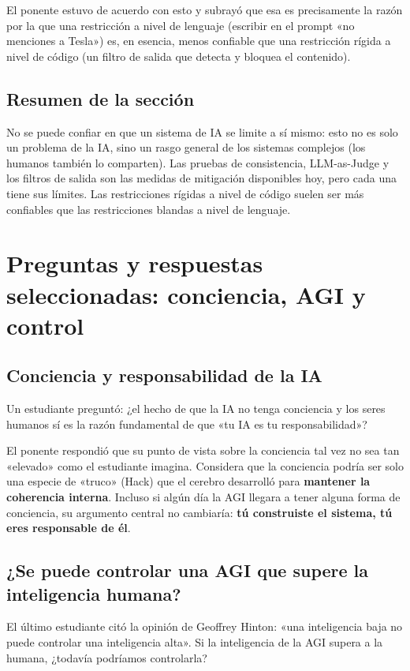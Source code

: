 \documentclass[a4paper]{article}
\begin{document}
El ponente estuvo de acuerdo con esto y subrayó que esa es precisamente la razón por la que una restricción a nivel de lenguaje (escribir en el prompt «no menciones a Tesla») es, en esencia, menos confiable que una restricción rígida a nivel de código (un filtro de salida que detecta y bloquea el contenido).

\subsection{Resumen de la sección}

No se puede confiar en que un sistema de IA se limite a sí mismo: esto no es solo un problema de la IA, sino un rasgo general de los sistemas complejos (los humanos también lo comparten). Las pruebas de consistencia, LLM-as-Judge y los filtros de salida son las medidas de mitigación disponibles hoy, pero cada una tiene sus límites. Las restricciones rígidas a nivel de código suelen ser más confiables que las restricciones blandas a nivel de lenguaje.

\section{Preguntas y respuestas seleccionadas: conciencia, AGI y control}

\subsection{Conciencia y responsabilidad de la IA}

Un estudiante preguntó: ¿el hecho de que la IA no tenga conciencia y los seres humanos sí es la razón fundamental de que «tu IA es tu responsabilidad»?

El ponente respondió que su punto de vista sobre la conciencia tal vez no sea tan «elevado» como el estudiante imagina. Considera que la conciencia podría ser solo una especie de «truco» (Hack) que el cerebro desarrolló para \textbf{mantener la coherencia interna}. Incluso si algún día la AGI llegara a tener alguna forma de conciencia, su argumento central no cambiaría: \textbf{tú construiste el sistema, tú eres responsable de él}.

\subsection{¿Se puede controlar una AGI que supere la inteligencia humana?}

El último estudiante citó la opinión de Geoffrey Hinton: «una inteligencia baja no puede controlar una inteligencia alta». Si la inteligencia de la AGI supera a la humana, ¿todavía podríamos controlarla?
\end{document}
